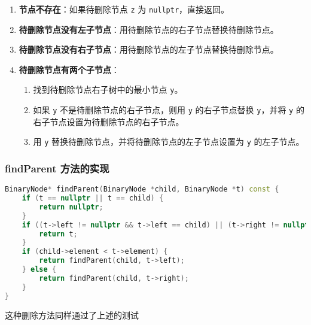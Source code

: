 \documentclass[UTF8]{ctexart}
\begin{document}
\begin{enumerate}
    \item \textbf{节点不存在}：如果待删除节点 \verb|z| 为 \verb|nullptr|，直接返回。
    \item \textbf{待删除节点没有左子节点}：用待删除节点的右子节点替换待删除节点。
    \item \textbf{待删除节点没有右子节点}：用待删除节点的左子节点替换待删除节点。
    \item \textbf{待删除节点有两个子节点}：
    \begin{enumerate}
        \item 找到待删除节点右子树中的最小节点 \verb|y|。
        \item 如果 \verb|y| 不是待删除节点的右子节点，则用 \verb|y| 的右子节点替换 \verb|y|，并将 \verb|y| 的右子节点设置为待删除节点的右子节点。
        \item 用 \verb|y| 替换待删除节点，并将待删除节点的左子节点设置为 \verb|y| 的左子节点。
    \end{enumerate}
\end{enumerate}

\subsubsection{findParent 方法的实现}

\begin{lstlisting}[language=C++, caption=findParent 方法的实现]
BinaryNode* findParent(BinaryNode *child, BinaryNode *t) const {
    if (t == nullptr || t == child) {
        return nullptr;
    }
    if ((t->left != nullptr && t->left == child) || (t->right != nullptr && t->right == child)) {
        return t;
    }
    if (child->element < t->element) {
        return findParent(child, t->left);
    } else {
        return findParent(child, t->right);
    }
}
\end{lstlisting}

这种删除方法同样通过了上述的测试
\end{document}
